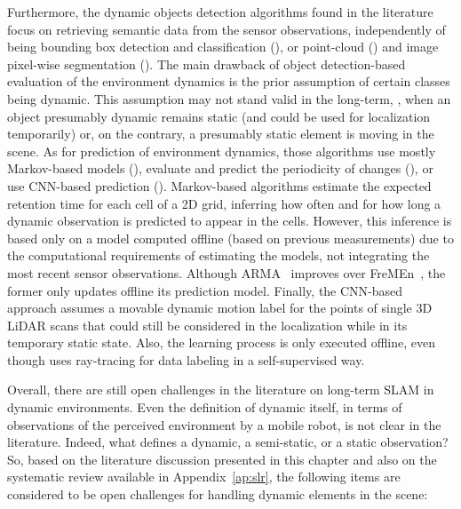 Furthermore, the dynamic objects detection algorithms found in the literature focus on retrieving semantic data from the sensor observations, independently of being bounding box detection and classification (\cite{yue-et-al:2020:9197072,zhu-et-al:2021:9561584,yang-et-al:2020:s20082432,xing-et-al:2022:22062}), or point-cloud (\cite{sun-et-al:2018:2856268}) and image pixel-wise segmentation (\cite{singh-et-al:2021:9564866,song-et-al:2019:8967749,ganti-waslander:2019:00024,bescos-et-al:2018:2860039,wang-et-al:2019:8793499,guo-liu:2021:9739362}).
The main drawback of object detection-based evaluation of the environment dynamics is the prior assumption of certain classes being dynamic. This assumption may not stand valid in the long-term, \eg, when an object presumably dynamic remains static (and could be used for localization temporarily) or, on the contrary, a presumably static element is moving in the scene.
As for prediction of environment dynamics, those algorithms use mostly Markov-based models (\cite{tipaldi-et-al:2013:0278364913502830,rapp-et-al:2015:77}), evaluate and predict the periodicity of changes (\cite{krajník-et-al:2017:2665664,santos-et-al:2016:2516594,wang-et-al:2020:9468884}), or use \gls{CNN}-based prediction (\cite{thomas-et-al:2022:9812297}).
Markov-based algorithms estimate the expected retention time for each cell of a 2D grid, inferring how often and for how long a dynamic observation is predicted to appear in the cells. However, this inference is based only on a model computed offline (based on previous measurements) due to the computational requirements of estimating the models, not integrating the most recent sensor observations.
Although \gls{ARMA}~\cite{wang-et-al:2020:9468884} improves over \gls{FreMEn}~\cite{krajník-et-al:2017:2665664,santos-et-al:2016:2516594}, the former only updates offline its prediction model.
Finally, the \gls{CNN}-based approach \cite{thomas-et-al:2022:9812297} assumes a movable dynamic motion label for the points of single 3D \gls{LiDAR} scans that could still be considered in the localization while in its temporary static state. Also, the learning process is only executed offline, even though uses ray-tracing for data labeling in a self-supervised way.

Overall, there are still open challenges in the literature on long-term \gls{SLAM} in dynamic environments. Even the definition of dynamic itself, in terms of observations of the perceived environment by a mobile robot, is not clear in the literature. Indeed, what defines a dynamic, a semi-static, or a static observation?
So, based on the literature discussion presented in this chapter and also on the systematic review available in Appendix~\ref{ap:slr}, the following items are considered to be open challenges for handling dynamic elements in the scene:

